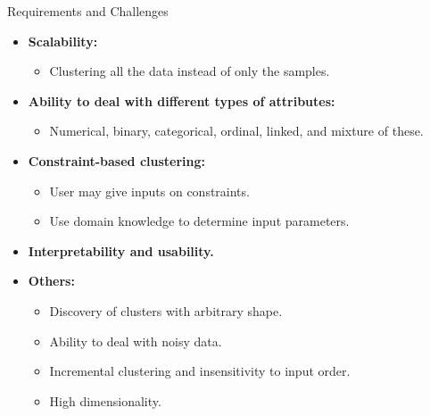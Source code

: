 \begin{frame}{Requirements and Challenges}
	\begin{itemize}
		\item \textbf{Scalability:}
		\begin{itemize}
			\item Clustering all the data instead of only the samples.
		\end{itemize}
		\item \textbf{Ability to deal with different types of attributes:}
		\begin{itemize}
			\item Numerical, binary, categorical, ordinal, linked, and mixture 
			of these.
		\end{itemize}
		\item \textbf{Constraint-based clustering:}
		\begin{itemize}
			\item User may give inputs on constraints.
			\item Use domain knowledge to determine input parameters.
		\end{itemize}
		\item \textbf{Interpretability and usability.}
		\item \textbf{Others:}
		\begin{itemize}
			\item Discovery of clusters with arbitrary shape.
			\item Ability to deal with noisy data.
			\item Incremental clustering and insensitivity to input order.
			\item High dimensionality.
		\end{itemize}
	\end{itemize}
\end{frame}

